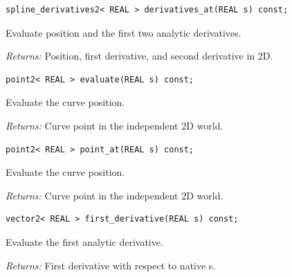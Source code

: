 \par\noindent\begin{minipage}{\linewidth}
\begin{lstlisting}[style=apireference]
spline_derivatives2< REAL > derivatives_at(REAL s) const;
\end{lstlisting}
{\footnotesize Evaluate position and the first two analytic derivatives.\par}
{\footnotesize\textit{Returns:} Position, first derivative, and second derivative in 2D.\par}
\end{minipage}\par\vspace{1pt}
\par\noindent\begin{minipage}{\linewidth}
\begin{lstlisting}[style=apireference]
point2< REAL > evaluate(REAL s) const;
\end{lstlisting}
{\footnotesize Evaluate the curve position.\par}
{\footnotesize\textit{Returns:} Curve point in the independent 2D world.\par}
\end{minipage}\par\vspace{1pt}
\par\noindent\begin{minipage}{\linewidth}
\begin{lstlisting}[style=apireference]
point2< REAL > point_at(REAL s) const;
\end{lstlisting}
{\footnotesize Evaluate the curve position.\par}
{\footnotesize\textit{Returns:} Curve point in the independent 2D world.\par}
\end{minipage}\par\vspace{1pt}
\par\noindent\begin{minipage}{\linewidth}
\begin{lstlisting}[style=apireference]
vector2< REAL > first_derivative(REAL s) const;
\end{lstlisting}
{\footnotesize Evaluate the first analytic derivative.\par}
{\footnotesize\textit{Returns:} First derivative with respect to native s.\par}
\end{minipage}\par\vspace{1pt}

